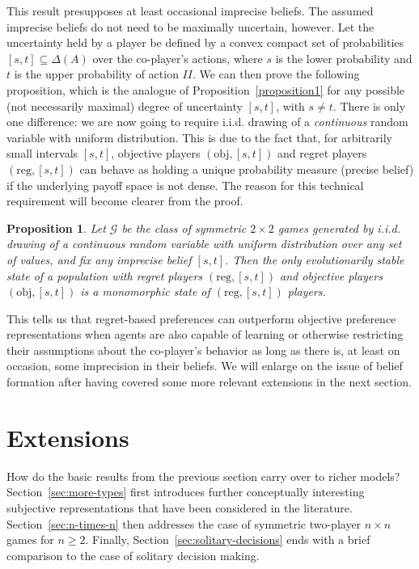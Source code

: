 \documentclass[fleqn,reqno,12pt]{article}
\theoremstyle{Satz}
\newtheorem{proposition}{Proposition}
\theoremstyle{Bsp}
\begin{document}
This result presupposes at least occasional imprecise beliefs. The assumed imprecise beliefs do not need to be maximally uncertain, however.  Let
the uncertainty held by a player be defined by a convex compact set of probabilities
$ [s,t] \subseteq \Delta(A) $ over the co-player's actions, where $s$ is the lower probability
and $t$ is the upper probability of action $II$.  We can then prove the following proposition,
which is the analogue of Proposition~\ref{proposition1} for any possible (not necessarily
maximal) degree of uncertainty $[s,t]$, with $s \neq t$. There is only one difference: we are
now going to require i.i.d. drawing of a \emph{continuous} random variable with uniform distribution. This is due to the
fact that, for arbitrarily small intervals $[s,t]$, objective players $(\text{obj},[s,t])$ and
regret players $(\text{reg},[s,t])$ can behave as holding a unique probability measure (precise
belief) if the underlying payoff space is not dense. The reason for this technical requirement
will become clearer from the proof.

\begin{proposition} \label{proposition2} Let $\mathcal{G}$ be the class of symmetric $2\times2$ games generated
  by i.i.d. drawing of a continuous random variable with uniform distribution over any set of values, and fix any imprecise
  belief $[s,t]$. Then the only evolutionarily stable state of a population with regret players
  $(\text{reg},[s,t])$ and objective players $(\text{obj},[s,t])$ is a monomorphic state of
  $(\text{reg},[s,t])$ players.
\end{proposition}

This tells us that regret-based preferences can outperform objective preference
representations when agents are also capable of learning or otherwise restricting their assumptions
about the co-player's behavior as long as there is, at least on occasion, some imprecision in
their beliefs. We will enlarge on the issue of belief formation after having covered some more
relevant extensions in the next section.

\section{Extensions}
\label{sec:extensions}

How do the basic results from the previous section carry over to richer models?
Section~\ref{sec:more-types} first introduces further conceptually interesting subjective
representations that have been considered in the literature. Section~\ref{sec:n-times-n} then
addresses the case of symmetric two-player $n \times n$ games for $n \ge 2$. Finally,
Section~\ref{sec:solitary-decisions} ends with a brief comparison to the case of solitary
decision making.
\end{document}
